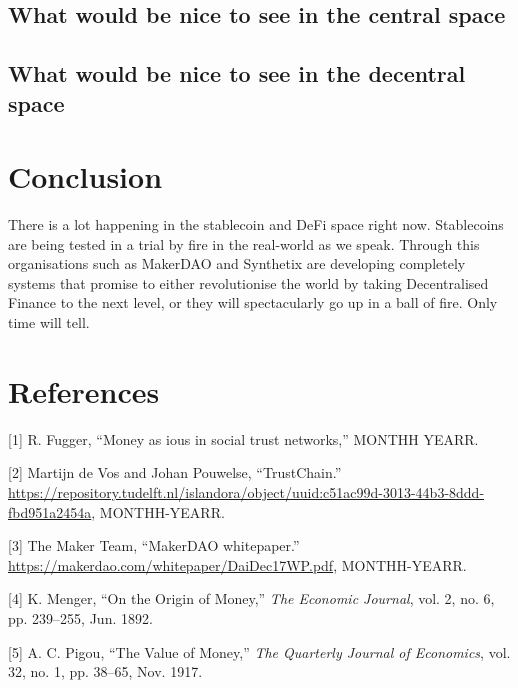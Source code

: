 \documentclass[english,]{IEEEtran}
\begin{document}
\subsection{What would be nice to see in the central
space}\label{what-would-be-nice-to-see-in-the-central-space}

\subsection{What would be nice to see in the decentral
space}\label{what-would-be-nice-to-see-in-the-decentral-space}

\section{Conclusion}\label{conclusion}

There is a lot happening in the stablecoin and DeFi space right now.
Stablecoins are being tested in a trial by fire in the real-world as we
speak. Through this organisations such as MakerDAO and Synthetix are
developing completely systems that promise to either revolutionise the
world by taking Decentralised Finance to the next level, or they will
spectacularly go up in a ball of fire. Only time will tell.

\section*{References}\label{references}

\hypertarget{refs}{}
\hypertarget{ref-Money_as_IOUs_in_Social_Trust_Networks}{}
{[}1{]} R. Fugger, ``Money as ious in social trust networks,'' MONTHH
YEARR.

\hypertarget{ref-TrustChain}{}
{[}2{]} Martijn de Vos and Johan Pouwelse, ``TrustChain.''
\url{https://repository.tudelft.nl/islandora/object/uuid:c51ac99d-3013-44b3-8ddd-fbd951a2454a},
MONTHH-YEARR.

\hypertarget{ref-MakerDAO:whitepaper}{}
{[}3{]} The Maker Team, ``MakerDAO whitepaper.''
\url{https://makerdao.com/whitepaper/DaiDec17WP.pdf}, MONTHH-YEARR.

\hypertarget{ref-On_the_Origin_of_Money}{}
{[}4{]} K. Menger, ``On the Origin of Money,'' \emph{The Economic
Journal}, vol. 2, no. 6, pp. 239--255, Jun. 1892.

\hypertarget{ref-Value_of_Money}{}
{[}5{]} A. C. Pigou, ``The Value of Money,'' \emph{The Quarterly Journal
of Economics}, vol. 32, no. 1, pp. 38--65, Nov. 1917.
\end{document}
